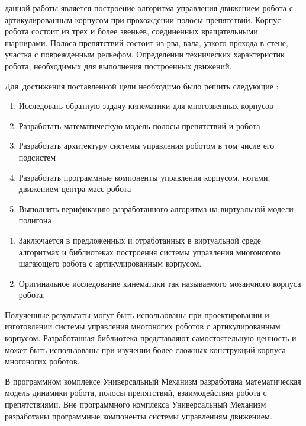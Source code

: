 {\aim} данной работы является построение алгоритма управления движением робота с артикулированным корпусом при прохождении полосы препятствий. Корпус робота состоит из трех и более звеньев, соединенных вращательными шарнирами. Полоса препятствий состоит из рва, вала, узкого прохода в стене, участка с поврежденным рельефом. Определении технических характеристик робота, необходимых для выполнения построенных движений.

Для~достижения поставленной цели необходимо было решить следующие {\tasks}:
\begin{enumerate}
  \item Исследовать обратную задачу кинематики для многозвенных корпусов
  \item Разработать математическую модель полосы препятствий и робота
  \item Разработать архитектуру системы управления роботом в том числе его подсистем
  \item Разработать программные компоненты управления корпусом, ногами, движением центра масс робота
  \item Выполнить верификацию разработанного алгоритма на виртуальной модели полигона
\end{enumerate}


{\novelty}
\begin{enumerate}
  \item Заключается в предложенных и отработанных в виртуальной среде алгоритмах и библиотеках построения системы управления многоногого шагающего робота с артикулированным корпусом.
  \item Оригинальное исследование кинематики так называемого мозаичного корпуса робота.
\end{enumerate}

{\influence} Полученные результаты могут быть использованы при проектировании и изготовлении системы управления многоногих роботов с артикулированным корпусом. Разработанная библиотека представляют самостоятельную ценность и может быть использованы при изучении более сложных конструкций корпуса многоногих роботов.

{\methods} 
В программном комплексе Универсальный Механизм разработана математическая модель динамики робота, полосы препятствий, взаимодействия робота с препятствиями. Вне программного комплекса Универсальный Механизм разработаны программные компоненты системы управлениям движением.



